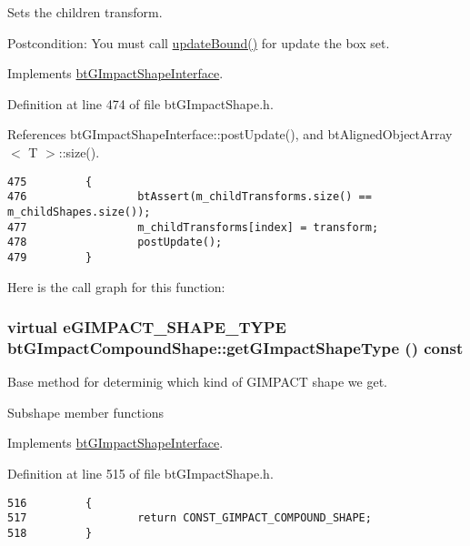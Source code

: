 Sets the children transform. 

\begin{Desc}
\item[Postcondition:]You must call \hyperlink{classbt_g_impact_shape_interface_cb26c2d7a2aecabd06b996b72b848492}{updateBound()} for update the box set. \end{Desc}


Implements \hyperlink{classbt_g_impact_shape_interface_83392f97bd7dfeb71ccdce6913a465b0}{btGImpactShapeInterface}.

Definition at line 474 of file btGImpactShape.h.

References btGImpactShapeInterface::postUpdate(), and btAlignedObjectArray$<$ T $>$::size().

\begin{Code}\begin{verbatim}475         {
476                 btAssert(m_childTransforms.size() == m_childShapes.size());
477                 m_childTransforms[index] = transform;
478                 postUpdate();
479         }
\end{verbatim}
\end{Code}




Here is the call graph for this function:\hypertarget{classbt_g_impact_compound_shape_861967c52cb52a358b8d99aa4c65e306}{
\subsubsection[getGImpactShapeType]{\setlength{\rightskip}{0pt plus 5cm}virtual eGIMPACT\_\-SHAPE\_\-TYPE btGImpactCompoundShape::getGImpactShapeType () const}}
\label{classbt_g_impact_compound_shape_861967c52cb52a358b8d99aa4c65e306}


Base method for determinig which kind of GIMPACT shape we get. 

Subshape member functions 

Implements \hyperlink{classbt_g_impact_shape_interface_25cacbe448997e3f8ec99cb2d4952859}{btGImpactShapeInterface}.

Definition at line 515 of file btGImpactShape.h.

\begin{Code}\begin{verbatim}516         {
517                 return CONST_GIMPACT_COMPOUND_SHAPE;
518         }
\end{verbatim}
\end{Code}




